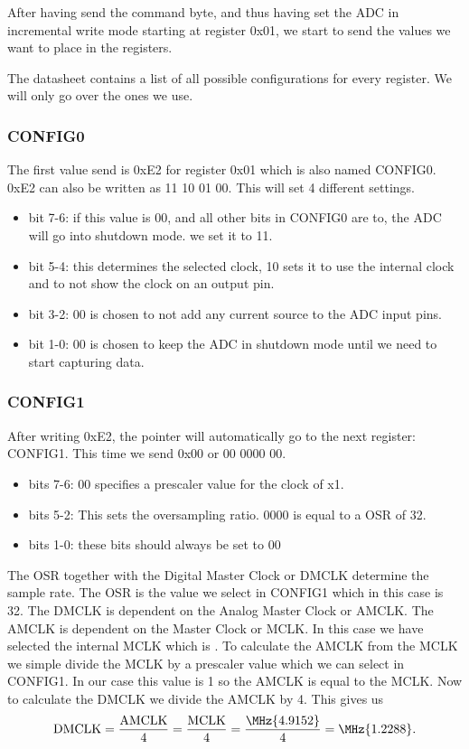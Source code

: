       After having send the command byte, and thus having set the ADC in incremental write mode starting at register 0x01, we start to send the values we want to place in the registers. 

      The datasheet contains a list of all possible configurations for every register. We will only go over the ones we use.

    \subsubsection*{CONFIG0}\label{sss: CONFIG0}
      The first value send is 0xE2 for register 0x01 which is also named CONFIG0. 0xE2 can also be written as 11 10 01 00. This will set 4 different settings.
      \begin{itemize}
        \item bit 7-6: if this value is 00, and all other bits in CONFIG0 are to, the ADC will go into shutdown mode. we set it to 11.
        \item bit 5-4: this determines the selected clock, 10 sets it to use the internal clock and to not show the clock on an output pin.
        \item bit 3-2: 00 is chosen to not add any current source to the ADC input pins.
        \item bit 1-0: 00 is chosen to keep the ADC in shutdown mode until we need to start capturing data.
      \end{itemize}

    \subsubsection*{CONFIG1}\label{sss: CONFIG1}
      After writing 0xE2, the pointer will automatically go to the next register: CONFIG1. This time we send 0x00 or 00 0000 00.
      \begin{itemize}
        \item bits 7-6: 00 specifies a prescaler value for the clock of x1.
        \item bits 5-2: This sets the oversampling ratio. 0000 is equal to a OSR of 32.
        \item bits 1-0: these bits should always be set to 00
      \end{itemize}

      The OSR together with the Digital Master Clock or DMCLK determine the sample rate. The OSR is the value we select in CONFIG1 which in this case is 32. The DMCLK is dependent on the Analog Master Clock or AMCLK. The AMCLK is dependent on the Master Clock or MCLK. In this case we have selected the internal MCLK which is . To calculate the AMCLK from the MCLK we simple divide the MCLK by a prescaler value which we can select in CONFIG1. In our case this value is 1 so the AMCLK is equal to the MCLK. Now to calculate the DMCLK we divide the AMCLK by 4. This gives us 
      \begin{equation}\label{eq: DMCLK}
        \text{DMCLK} = \frac{\text{AMCLK}}{4} = \frac{\text{MCLK}}{4} = \frac{\MHz{4.9152}}{4} = \MHz{1.2288}.
      \end{equation}

